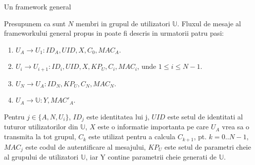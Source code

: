 \documentclass[11pt]{beamer}
\begin{document}
\begin{frame}{Un framework general}

Presupunem ca sunt $N$ membri in grupul de utilizatori $\mathbb{U}$. Fluxul de mesaje al frameworkului general propus in \cite{fagrauth} poate fi descris in urmatorii patru pasi:
\begin{enumerate}

\item $U_A \rightarrow U_1: ID_A, UID, X, C_0, MAC_A$.

\item $U_i \rightarrow U_{i+1}: ID_i, UID, X, KP_U, C_i, MAC_i$, unde $1 \leq i \leq N - 1$.

\item $U_N \rightarrow U_A: ID_N, KP_U, C_N, MAC_N$.

\item $U_A \rightarrow \mathbb{U}: Y, MAC'_A$.

\end{enumerate}
Pentru $j \in \{A,N,U_i\}$, 
$ID_j$ este identitatea lui j, $UID$ este setul de identitati al tuturor utilizatorilor din $\mathbb{U}$, $X$ este o informatie importanta pe care $U_A$ vrea sa o transmita la tot grupul, $C_k$ este utilizat pentru a calcula $C_{k+1}$, pt. $k=0..N-1$, $MAC_j$ este codul de autentificare al mesajului, $KP_U$ este setul de parametri cheie al grupului de utilizatori $\mathbb{U}$, iar Y contine parametrii cheie generati de $\mathbb{U}$.

\end{frame}
\end{document}
